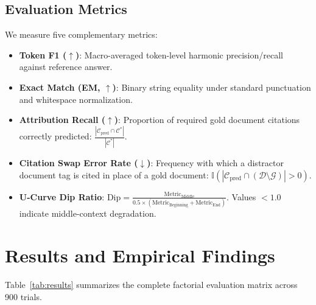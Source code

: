 \documentclass[manuscript,screen,oneside]{acmart}
\begin{document}
\subsection{Evaluation Metrics}
We measure five complementary metrics:
\begin{itemize}
    \item \textbf{Token F1 ($\uparrow$)}: Macro-averaged token-level harmonic precision/recall against reference answer.
    \item \textbf{Exact Match (EM, $\uparrow$)}: Binary string equality under standard punctuation and whitespace normalization.
    \item \textbf{Attribution Recall ($\uparrow$)}: Proportion of required gold document citations correctly predicted: $\frac{|\mathcal{C}_{\text{pred}} \cap \mathcal{C}^*|}{|\mathcal{C}^*|}$.
    \item \textbf{Citation Swap Error Rate ($\downarrow$)}: Frequency with which a distractor document tag is cited in place of a gold document: $\mathbb{I}(|\mathcal{C}_{\text{pred}} \cap (\mathcal{D} \setminus \mathcal{G})| > 0)$.
    \item \textbf{U-Curve Dip Ratio}: $\text{Dip} = \frac{\text{Metric}_{\text{Middle}}}{0.5 \times (\text{Metric}_{\text{Beginning}} + \text{Metric}_{\text{End}})}$. Values $< 1.0$ indicate middle-context degradation.
\end{itemize}

\section{Results and Empirical Findings}\label{sec:results}

Table~\ref{tab:results} summarizes the complete factorial evaluation matrix across 900 trials.
\end{document}
